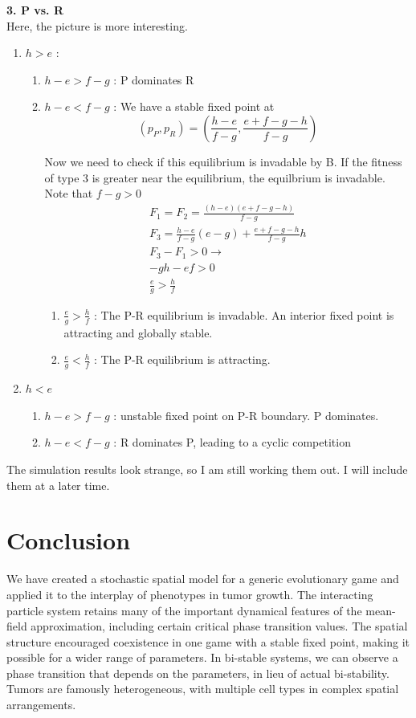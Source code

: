 \documentclass[12pt]{report}
\begin{document}
\textbf{3. P vs. R} \\
Here, the picture is more interesting. 
\begin{enumerate}
	\item $h > e$ : 
	\begin{enumerate}
		\item $h - e > f - g$ : P dominates R
		\item $h - e < f - g$ : We have a stable fixed point at 
		$$(p_P, p_R) = (\frac{h - e}{f-g}, \frac{e + f - g- h}{f -g})$$ 
		
		 Now we need to check if this equilibrium is invadable by B. If the fitness of type 3 is greater near the equilibrium, the equilbrium is invadable. Note that $f - g > 0$
		\begin{gather*}
		F_1 = F_2 = \frac{(h - e)(e + f  - g - h)}{f - g} \\
		F_3 = \frac{h- e}{f-g} (e - g) + \frac{e + f - g - h}{f - g} h \\
		F_3 - F_1 > 0 \rightarrow \\
		- g h - ef > 0 \\
		\frac{e}{g} > \frac{h}{f}
		\end{gather*}
		
		\begin{enumerate}
			\item $\frac{e}{g} > \frac{h}{f}$ : The P-R equilibrium is invadable. An interior fixed point is attracting and globally stable.
			\item  $\frac{e}{g} < \frac{h}{f}$ : The P-R equilibrium is attracting.
		\end{enumerate}
	\end{enumerate}
	\item $h < e$
	\begin{enumerate}
		\item $h - e > f -g$  : unstable fixed point on P-R boundary. P dominates.
		\item $h - e < f - g$ : R dominates P, leading to a cyclic competition
	\end{enumerate}
\end{enumerate}




The simulation results look strange, so I am still working them out. I will include them at a later time. 



\chapter*{Conclusion}
We have created a stochastic spatial model for a generic evolutionary game and applied it to the interplay of phenotypes in tumor growth. The interacting particle system retains many of the important dynamical features of the mean-field approximation, including certain critical phase transition values. The spatial structure encouraged coexistence in one game with a stable fixed point, making it possible for a wider range of parameters. In bi-stable systems, we can observe a phase transition that depends on the parameters, in lieu of actual bi-stability. Tumors are famously heterogeneous, with multiple cell types in complex spatial arrangements. \\
\end{document}
